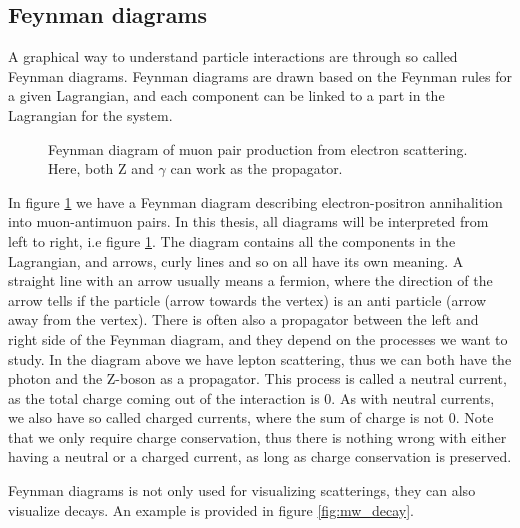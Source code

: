 \subsection*{Feynman diagrams}
A graphical way to understand particle interactions are through so called Feynman diagrams. Feynman diagrams are drawn based on the Feynman rules for a given Lagrangian\cite{Pich:819632}\cite{feynrules}, and each component 
can be linked to a part in the Lagrangian for the system. 

\begin{figure}[h!]
    \centering
    \caption[Electron scattering diagram]{Feynman diagram of muon pair production from electron scattering. Here, both Z and $\gamma$ can work as the propagator.}
    
    \label{fig:eemm_scat}
\end{figure}

In figure \ref{fig:eemm_scat} we have a Feynman diagram describing electron-positron annihalition into muon-antimuon pairs. In this thesis, all 
diagrams will be interpreted from left to right, i.e figure \ref{fig:eemm_scat}. 
The diagram contains all the components in the Lagrangian, and arrows, curly lines and so on all have its own meaning. A straight line with 
an arrow usually means a fermion, where the direction of the arrow tells if the particle (arrow towards the vertex) is an anti particle (arrow away from the vertex). 
There is often also a propagator between the left and right side of the Feynman diagram, 
and they depend on the processes we want to study. In the diagram above we have lepton scattering, thus we can both have the photon and the 
Z-boson as a propagator. This process is called a neutral current\cite{Pich:819632}, as the total charge coming out of the interaction is 0. 
As with neutral currents, we also have so called charged currents, where the sum of charge is not 0. Note that we only require charge conservation,
thus there is nothing wrong with either having a neutral or a charged current, as long as charge conservation is preserved. \par 
Feynman diagrams is not only used for visualizing scatterings, they can also visualize decays. An example is provided in figure \ref{fig:mw_decay}. 

